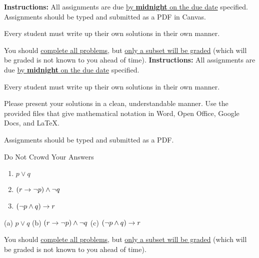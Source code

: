 
\extrawidth{0.5in} \extrafootheight{-0in} \pagestyle{headandfoot}
\headrule {} \footrule {}


\ifprintanswers
\noindent \textbf{Instructions:} All assignments are due \underline{by \textbf{midnight} on the due date} specified.  Assignments should be typed and submitted as a PDF in Canvas.   

\medskip
\noindent Every student must write up their own solutions in their own manner.

\medskip
\noindent You should \underline{complete all problems}, but \underline{only a subset will be graded} (which will be graded is not known to you ahead of time). 
\else
\noindent \textbf{Instructions:} All assignments are due \underline{by \textbf{midnight} on the due date} specified.  

\medskip
\noindent Every student must write up their own solutions in their own manner.

\medskip
\noindent Please present your solutions in a clean, understandable
manner.  Use the provided files that give mathematical notation in Word, Open Office, Google Docs, and \LaTeX. 

\medskip
\noindent Assignments should be typed and submitted as a PDF. 

\medskip 
\noindent  Do Not Crowd Your Answers

\begin{tcolorbox}[colback=green!10,colframe=gray!10!green, title=Good Example]
\begin{enumerate}[label=(\alph*),itemsep=2pt,parsep=0pt,topsep=0pt,partopsep=0pt]
	\item $p \vee q$ 
	\item $(r \rightarrow \neg p) \wedge \neg q$ 
	\item $(\neg p \wedge q) \rightarrow r$
\end{enumerate}
\end{tcolorbox}  

\begin{tcolorbox}[colback=red!10,colframe=gray!10!red, title=Bad Example]
 (a) $p \vee q$ (b) $(r \rightarrow \neg p) \wedge \neg q$  (c) $(\neg p \wedge q) \rightarrow r$
\end{tcolorbox} 

\medskip
\noindent You should \underline{complete all problems}, but \underline{only a subset will be graded} (which will be graded is not known to you ahead of time). 
\fi

